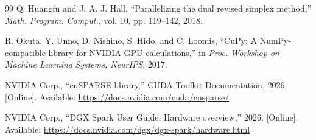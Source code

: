 \documentclass[10pt,journal]{IEEEtran}
\begin{document}
\begin{thebibliography}{99}
Q. Huangfu and J. A. J. Hall, \textquotedblleft{}Parallelizing the dual revised simplex
method,\textquotedblright{} \emph{Math. Program. Comput.}, vol. 10, pp. 119--142, 2018.

\newpage
{}
R. Okuta, Y. Unno, D. Nishino, S. Hido, and C. Loomis,
\textquotedblleft{}CuPy: A NumPy-compatible library for NVIDIA GPU calculations,\textquotedblright{} in
\emph{Proc. Workshop on Machine Learning Systems, NeurIPS}, 2017.

NVIDIA Corp., \textquotedblleft{}cuSPARSE library,\textquotedblright{} CUDA Toolkit Documentation, 2026.
[Online]. Available: \url{https://docs.nvidia.com/cuda/cusparse/}

NVIDIA Corp., \textquotedblleft{}DGX Spark User Guide: Hardware overview,\textquotedblright{} 2026.
[Online]. Available: \url{https://docs.nvidia.com/dgx/dgx-spark/hardware.html}

\end{thebibliography}
\end{document}
